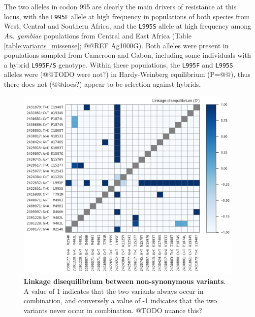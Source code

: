 \documentclass[a4paper,11pt,abstracton]{scrartcl}
\begin{document}
The two alleles in codon 995 are clearly the main drivers of resistance at this locus, with the \texttt{L995F} allele at high frequency in populations of both species from West, Central and Southern Africa, and the \texttt{L995S} allele at high frequency among \textit{An. gambiae} populations from Central and East Africa (Table \ref{table:variants_missense}; @@REF Ag1000G).
%
Both alleles were present in populations sampled from Cameroon and Gabon, including some individuals with a hybrid \texttt{L995F/S} genotype. Within these populations, the \texttt{L995F} and \texttt{L995S} alleles were (@@TODO were not?) in Hardy-Weinberg equilibrium (P=@@), thus there does not (@@does?) appear to be selection against hybrids.


\begin{figure}[!b]
  \includegraphics[width=1\linewidth,center]{artwork/fig_ld.png}
  \caption{\textbf{Linkage disequilibrium between non-synonymous variants}. A value of 1 indicates that the two variants always occur in combination, and conversely a value of -1 indicates that the two variants never occur in combination. @TODO nuance this?}
  \label{fig:ld}
\end{figure}
\end{document}
